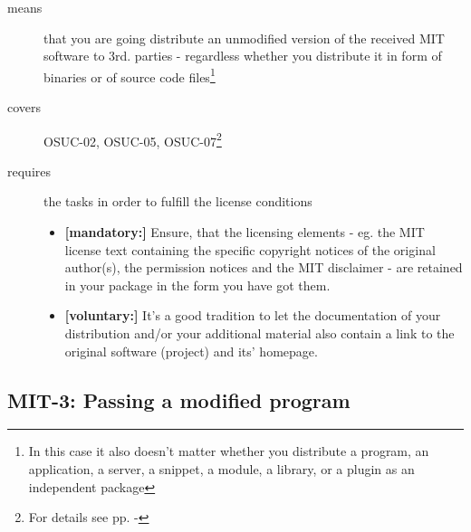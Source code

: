 \begin{description}
\item[means] that you are going distribute an unmodified version of the received
MIT software to 3rd. parties - regardless whether you distribute it in form of
binaries or of source code files\footnote{In this case it also doesn't matter
whether you distribute a program, an application, a server, a snippet, a module,
a library, or a plugin as an independent package}

\item[covers] OSUC-02, OSUC-05, OSUC-07\footnote{For details see pp.
\pageref{OSUC-02-DEF} - \pageref{OSUC-07-DEF}}

\item[requires] the tasks in order to fulfill the license conditions
\begin{itemize}
  \item \textbf{[mandatory:]} Ensure, that the licensing elements - eg.
  the MIT license text containing the specific copyright notices of the original
  author(s), the permission notices and the MIT disclaimer - are retained in
  your package in the form you have got them.
  \item \textbf{[voluntary:]} It's a good tradition to let the documentation of
  your distribution and/or your additional material also contain a link to the
  original software (project) and its' homepage.
\end{itemize}
\end{description}

\subsection{MIT-3: Passing a modified program}
\label{OSUC-04-MIT}

